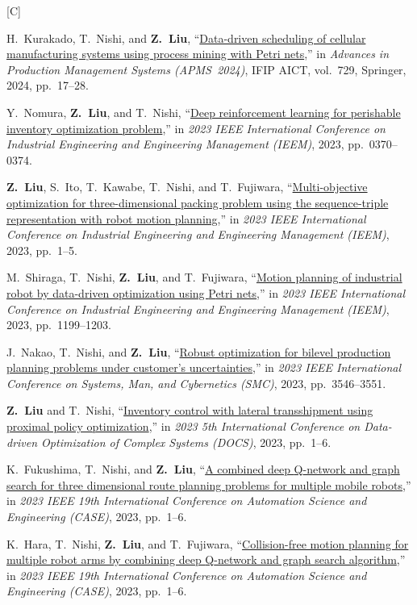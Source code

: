 \documentclass[11pt,a4paper]{article}
\newcommand{\doititle}[2]{\href{https://doi.org/#1}{#2}}
\newlength{\datecol}
\newcounter{pubno}
\newenvironment{publist}[1]{%
  \begin{list}{[#1\arabic{pubno}]}{%
    \usecounter{pubno}%
    \setlength{\leftmargin}{\datecol}%
    \setlength{\labelwidth}{\datecol}%
    \setlength{\labelsep}{0pt}%
    \setlength{\itemsep}{3pt}%
    \setlength{\parsep}{0pt}%
    \setlength{\topsep}{2pt}%
    \renewcommand{\makelabel}[1]{##1\hfil}}}%
  {\end{list}}
\begin{document}
\begin{publist}{C}
\item H.~Kurakado, T.~Nishi, and \textbf{Z.~Liu}, ``\doititle{10.1007/978-3-031-65894-5_2}{Data-driven scheduling of cellular manufacturing systems using process mining with {P}etri nets},'' in \textit{Advances in Production Management Systems (APMS~2024)}, IFIP AICT, vol.~729, Springer, 2024, pp.~17--28.
\item Y.~Nomura, \textbf{Z.~Liu}, and T.~Nishi, ``\doititle{10.1109/ieem58616.2023.10406759}{Deep reinforcement learning for perishable inventory optimization problem},'' in \textit{2023 IEEE International Conference on Industrial Engineering and Engineering Management (IEEM)}, 2023, pp.~0370--0374.
\item \textbf{Z.~Liu}, S.~Ito, T.~Kawabe, T.~Nishi, and T.~Fujiwara, ``\doititle{10.1109/ieem58616.2023.10406772}{Multi-objective optimization for three-dimensional packing problem using the sequence-triple representation with robot motion planning},'' in \textit{2023 IEEE International Conference on Industrial Engineering and Engineering Management (IEEM)}, 2023, pp.~1--5.
\item M.~Shiraga, T.~Nishi, \textbf{Z.~Liu}, and T.~Fujiwara, ``\doititle{10.1109/ieem58616.2023.10406354}{Motion planning of industrial robot by data-driven optimization using {P}etri nets},'' in \textit{2023 IEEE International Conference on Industrial Engineering and Engineering Management (IEEM)}, 2023, pp.~1199--1203.
\item J.~Nakao, T.~Nishi, and \textbf{Z.~Liu}, ``\doititle{10.1109/smc53992.2023.10394540}{Robust optimization for bilevel production planning problems under customer's uncertainties},'' in \textit{2023 IEEE International Conference on Systems, Man, and Cybernetics (SMC)}, 2023, pp.~3546--3551.
\item \textbf{Z.~Liu} and T.~Nishi, ``\doititle{10.1109/docs60977.2023.10294547}{Inventory control with lateral transshipment using proximal policy optimization},'' in \textit{2023 5th International Conference on Data-driven Optimization of Complex Systems (DOCS)}, 2023, pp.~1--6.
\item K.~Fukushima, T.~Nishi, and \textbf{Z.~Liu}, ``\doititle{10.1109/case56687.2023.10260638}{A combined deep {Q}-network and graph search for three dimensional route planning problems for multiple mobile robots},'' in \textit{2023 IEEE 19th International Conference on Automation Science and Engineering (CASE)}, 2023, pp.~1--6.
\item K.~Hara, T.~Nishi, \textbf{Z.~Liu}, and T.~Fujiwara, ``\doititle{10.1109/case56687.2023.10260329}{Collision-free motion planning for multiple robot arms by combining deep {Q}-network and graph search algorithm},'' in \textit{2023 IEEE 19th International Conference on Automation Science and Engineering (CASE)}, 2023, pp.~1--6.

\end{publist}
\end{document}
